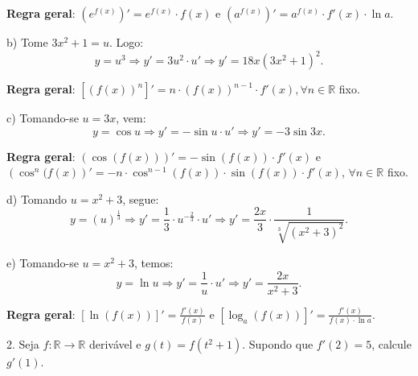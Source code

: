 \documentclass{article}
\begin{document}
{\begin{newpage}
\par
\vspace{0.2cm}
\textbf{Regra geral}: $(e^{f(x)})'=e^{f(x)}\cdot f(x)$ e $(a^{f(x)})'=a^{f(x)}\cdot f'(x)\cdot \ln{a}$.
\par
\vspace{0.3cm}
b) Tome $3x^2 + 1=u$. Logo:
\begin{equation*} y=u^3 \Rightarrow y'=3u{^2}\cdot u' \Rightarrow y'=18x(3x^2 + 1)^{2}. \end{equation*}
\par
\vspace{0.2cm}
\textbf{Regra geral}: $[(f(x))^n]'=n\cdot (f(x))^{n-1}\cdot f'(x), \forall n\in\mathbb{R}$ fixo.
\par
\vspace{0.3cm}
c) Tomando-se $u=3x$, vem:
\begin{equation*} y=\cos{u} \Rightarrow y'=-\sin{u}\cdot u' \Rightarrow y'=-3\sin{3x}. \end{equation*}
\par
\vspace{0.2cm}
\textbf{Regra geral}: $(\cos{(f(x))})'=-\sin{(f(x))}\cdot f'(x)$ e $ (\cos^{n}{(f(x)})'=-n\cdot \cos^{n-1}{(f(x))}\cdot\sin{(f(x))}\cdot f'(x) $, $\forall n\in\mathbb{R}$ fixo.
\par
\vspace{0.3cm}
d) Tomando $u=x^2 + 3$, segue:
\begin{equation*} y=(u)^{\frac{1}{3}} \Rightarrow y'=\displaystyle{\frac{1}{3}}\cdot u^{-\frac{2}{3}}\cdot u' \Rightarrow y'=\displaystyle{\frac{2x}{3}}\cdot \displaystyle{\frac{1}{\sqrt[3]{(x^2 + 3)^2}}}. \end{equation*}
\par
\vspace{0.3cm}
e) Tomando-se $u=x^2 + 3$, temos:
\begin{equation*} y=\ln{u} \Rightarrow y'=\displaystyle{\frac{1}{u}}\cdot u' \Rightarrow y'=\displaystyle{\frac{2x}{x^2 + 3}}. \end{equation*}
\par
\vspace{0.2cm}
\textbf{Regra geral}: $[\ln{(f(x))}]'=\displaystyle{\frac{f'(x)}{f(x)}}$ e $[\log_{a}{(f(x))}]'=\displaystyle{\frac{f'(x)}{f(x)\cdot \ln{a}}}$.
\par
\vspace{0.3cm}
\begin{flushleft}
2. Seja $f:\mathbb{R}\rightarrow\mathbb{R}$ derivável e $g(t) = f(t^2 + 1)$. Supondo que $f'(2)=5$, calcule $g'(1)$.

\end{flushleft}
\end{newpage}}
\end{document}
